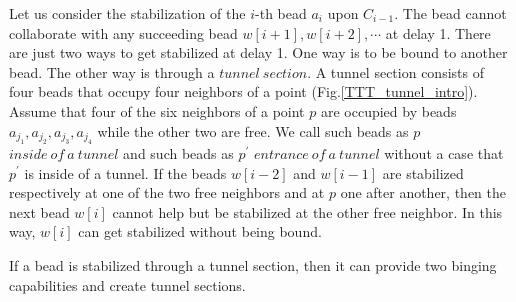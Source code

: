\documentclass[runningheads]{llncs}
\begin{document}
Let us consider the stabilization of the $i$-th bead $a_i$ upon $C_{i-1}$. The bead cannot collaborate with any succeeding bead $w[i+1],w[i+2],\cdots$ at delay 1. There are just two ways to get stabilized at delay 1. One way is to be bound to another bead. The other way is through a $tunnel\ section$. A tunnel section consists of four beads that occupy four neighbors of a point (Fig.\ref{TTT_tunnel_intro}). Assume that four of the six neighbors of a point $p$ are occupied by beads $a_{j_1},a_{j_2},a_{j_3},a_{j_4}$ while the other two are free. We call such beads as $p$ $inside\ of\ a\ tunnel$ and such beads as $p^\prime$ $entrance\ of\ a\ tunnel$ without a case that $p^\prime$ is inside of a tunnel. If the beads $w[i-2]$ and $w[i-1]$ are stabilized respectively at one of the two free neighbors and at $p$ one after another, then the next bead $w[i]$ cannot help but be stabilized at the other free neighbor. In this way, $w[i]$ can get stabilized without being bound.



If a bead is stabilized through a tunnel section, then it can provide two binging capabilities and create tunnel sections.
\end{document}
